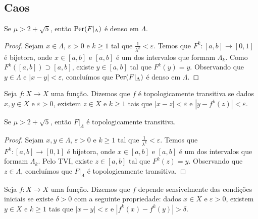 \subsection{Caos}

\begin{proposition}
\label{proposicao caos 1}
Se $\mu > 2 + \sqrt{5}$, então $\operatorname{Per}(F|_\Lambda)$ é denso em $\Lambda$.
\end{proposition}

\begin{proof}
Sejam $x \in \Lambda$, $\varepsilon > 0$ e $k \geq 1$ tal que $\frac{1}{\lambda^k} < \varepsilon$.
Temos que $F^k: [a, b] \to [0, 1]$ é bijetora, onde $x \in [a, b]$ e $[a, b]$ é um dos intervalos que formam $\Lambda_k$.
Como $F^k([a, b]) \supset [a, b]$, existe $y \in [a, b]$ tal que $F^k(y) = y$. Observando que $y \in \Lambda$ e $|x - y| < \varepsilon$, concluímos que $\operatorname{Per}(F|_\Lambda)$ é denso em $\Lambda$.
\end{proof}

\begin{definition}
Seja $f: X \to X$ uma função. Dizemos que $f$ é topologicamente transitiva se dados $x, y \in X$ e $\varepsilon > 0$,  existem $z \in X$ e $k \geq 1$ tais que $|x - z| < \varepsilon$ e $|y - f^k(z)| < \varepsilon$.
\end{definition} 

\begin{proposition}
\label{proposicao caos 2}
Se $\mu > 2 + \sqrt{5}$, então $F|_\Lambda$ é topologicamente transitiva.
\end{proposition}

\begin{proof}
Sejam $x, y \in \Lambda$, $\varepsilon > 0$ e $k \geq 1$ tal que $\frac{1}{\lambda^k} < \varepsilon$.
Temos que $F^k: [a, b] \to [0, 1]$ é bijetora, onde $x \in [a, b]$ e $[a, b]$ é um dos intervalos que formam $\Lambda_k$. Pelo TVI, existe $z \in [a, b]$ tal que $F^k(z) = y$. Observando que $z \in \Lambda$, concluímos que $F|_\Lambda$ é topologicamente transitiva.
\end{proof}

\begin{definition}
Seja $f: X \to X$ uma função. Dizemos que $f$ depende sensivelmente das condições iniciais se existe $\delta > 0$ com a seguinte propriedade: dados $x \in X$ e $\varepsilon > 0$, existem $y \in X$ e $k \geq 1$ tais que $|x - y| < \varepsilon$ e $|f^k(x) - f^k(y)| > \delta$.
\end{definition}

